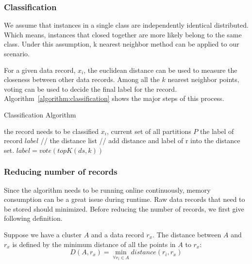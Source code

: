 \documentclass[runningheads]{llncs}
\begin{document}
	\subsubsection{Classification}
	
	We assume that instances in a single class are independently identical distributed. Which means, instances that closed together are more likely belong to the same class. Under this assumption, k nearest neighbor method can be applied to our scenario.
	
	For a given data record, $x_i$, the euclidean distance can be used to measure the closeness between other data records. Among all the $k$ nearest neighbor points, voting can be used to decide the final label for the record. Algorithm~\ref{algorithm:classification} shows the major steps of this process.
	
	\begin{algorithm}
		\caption{Classification Algorithm} \label{algorithm:classification}
		\begin{algorithmic}
			\REQUIRE the record needs to be classified $x_i$, current set of all partitions $P$
			\ENSURE the label of record $label$
			 // the distance list
			 // add distance and label of r into the distance set.
			\STATE $label = vote(topK(ds, k))$
			\ENDFOR
			\ENDFOR
		\end{algorithmic}
	\end{algorithm}
	
	\subsubsection{Reducing number of records}
	Since the algorithm needs to be running online continuously, memory consumption can be a great issue during runtime. Raw data records that need to be stored should minimized. Before reducing the number of records, we first give following definition.
	
	\begin{definition}
		
		Suppose we have a cluster $A$ and a data record $r_x$. The distance between $A$ and $r_x$ is defined by the minimum distance of all the points in $A$ to $r_x$:
		\begin{displaymath}
		D(A, r_x) = \min_{\forall r_i \in A} distance(r_i, r_x) 
		\end{displaymath}
	\end{definition}
	
\end{document}
